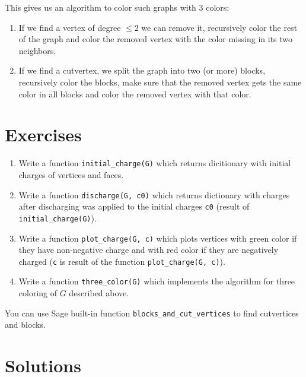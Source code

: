 This gives us an algorithm to color such graphs with 3 colors:
\begin{enumerate}
\item If we find a vertex of degree $\leq 2$ we can remove it, recursively color the rest of the graph and color the removed vertex with the color missing in its two neighbors.
\item If we find a cutvertex, we split the graph into two (or more) blocks, recursively color the blocks, make sure that the removed vertex gets the same color in all blocks and color the removed vertex with that color.
\end{enumerate}

\section{Exercises}

\begin{enumerate}
    \item Write a function \verb|initial_charge(G)| which returns dicitionary with initial charges of vertices and faces.
    \item Write a function \verb|discharge(G, c0)| which returns dictionary with charges after discharging was applied to the initial charges \verb|c0| (result of \verb|initial_charge(G)|).
    \item Write a function \verb|plot_charge(G, c)| which plots vertices with green color if they have non-negative charge and with red color if they are negatively charged (\verb|c| is result of the function \verb|plot_charge(G, c)|).
    \item Write a function \verb|three_color(G)| which implements the algorithm for three coloring of $G$ described above.
\end{enumerate}
You can use Sage built-in function \verb|blocks_and_cut_vertices| to find cutvertices and blocks.

\section{Solutions}

